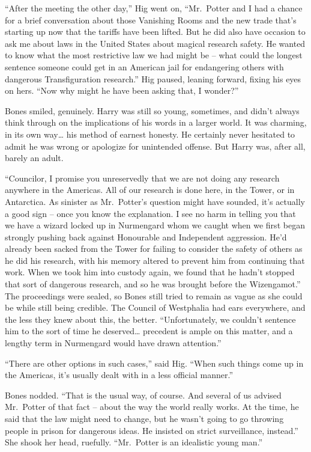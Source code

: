 ``After the meeting the other day,'' Hig went on, ``Mr.~Potter and I had
a chance for a brief conversation about those Vanishing Rooms and the
new trade that's starting up now that the tariffs have been lifted. But
he did also have occasion to ask me about laws in the United States
about magical research safety. He wanted to know what the most
restrictive law we had might be -- what could the longest sentence
someone could get in an American jail for endangering others with
dangerous Transfiguration research.'' Hig paused, leaning forward,
fixing his eyes on hers. ``Now why might he have been asking that, I
wonder?''

Bones smiled, genuinely. Harry was still so young, sometimes, and didn't
always think through on the implications of his words in a larger world.
It was charming, in its own way\ldots{} his method of earnest honesty.
He certainly never hesitated to admit he was wrong or apologize for
unintended offense. But Harry was, after all, barely an adult.

``Councilor, I promise you unreservedly that we are not doing any
research anywhere in the Americas. All of our research is done here, in
the Tower, or in Antarctica. As sinister as Mr.~Potter's question might
have sounded, it's actually a good sign -- once you know the
explanation. I see no harm in telling you that we have a wizard locked
up in Nurmengard whom we caught when we first began strongly pushing
back against Honourable and Independent aggression. He'd already been
sacked from the Tower for failing to consider the safety of others as he
did his research, with his memory altered to prevent him from continuing
that work. When we took him into custody again, we found that he hadn't
stopped that sort of dangerous research, and so he was brought before
the Wizengamot.'' The proceedings were sealed, so Bones still tried to
remain as vague as she could be while still being credible. The Council
of Westphalia had ears everywhere, and the less they knew about this,
the better. ``Unfortunately, we couldn't sentence him to the sort of
time he deserved\ldots{} precedent is ample on this matter, and a
lengthy term in Nurmengard would have drawn attention.''

``There are other options in such cases,'' said Hig. ``When such things
come up in the Americas, it's usually dealt with in a less official
manner.''

Bones nodded. ``That is the usual way, of course. And several of us
advised Mr.~Potter of that fact -- about the way the world really works.
At the time, he said that the law might need to change, but he wasn't
going to go throwing people in prison for dangerous ideas. He insisted
on strict surveillance, instead.'' She shook her head, ruefully.
``Mr.~Potter is an idealistic young man.''

